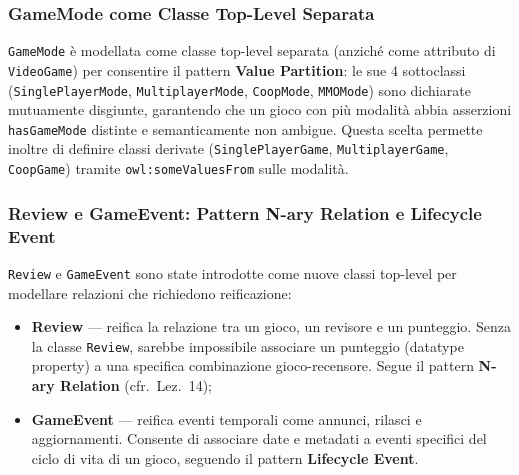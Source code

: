 \subsubsection{GameMode come Classe Top-Level Separata}

\texttt{GameMode} \`e modellata come classe top-level separata (anzich\'e come
attributo di \texttt{VideoGame}) per consentire il pattern \textbf{Value Partition}:
le sue 4 sottoclassi (\texttt{SinglePlayerMode}, \texttt{MultiplayerMode},
\texttt{CoopMode}, \texttt{MMOMode}) sono dichiarate mutuamente disgiunte,
garantendo che un gioco con pi\`u modalit\`a abbia asserzioni \texttt{hasGameMode}
distinte e semanticamente non ambigue. Questa scelta permette inoltre di definire
classi derivate (\texttt{SinglePlayerGame}, \texttt{MultiplayerGame}, \texttt{CoopGame})
tramite \texttt{owl:someValuesFrom} sulle modalit\`a.

\subsubsection{Review e GameEvent: Pattern N-ary Relation e Lifecycle Event}

\texttt{Review} e \texttt{GameEvent} sono state introdotte come nuove classi
top-level per modellare relazioni che richiedono reificazione:
\begin{itemize}[nosep]
  \item \textbf{Review} --- reifica la relazione tra un gioco, un revisore e un punteggio.
    Senza la classe \texttt{Review}, sarebbe impossibile associare un punteggio
    (datatype property) a una specifica combinazione gioco-recensore.
    Segue il pattern \textbf{N-ary Relation} (cfr.~Lez.~14);
  \item \textbf{GameEvent} --- reifica eventi temporali come annunci, rilasci e
    aggiornamenti. Consente di associare date e metadati a eventi specifici del
    ciclo di vita di un gioco, seguendo il pattern \textbf{Lifecycle Event}.
\end{itemize}
